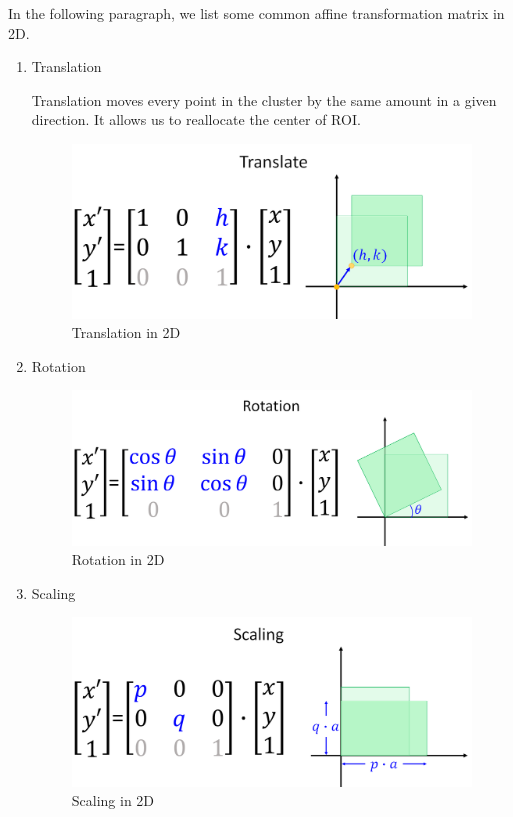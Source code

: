 In the following paragraph, we list some common affine transformation matrix in 2D.
\begin{enumerate}
    \item Translation 
            
            Translation moves every point in the cluster by the same amount in a given direction.
            It allows us to reallocate the center of ROI.

\begin{figure}[H]
\centering
\includegraphics[width=\textwidth]{Translation}
\caption{Translation in 2D}\label{fig:Translation}
\end{figure}


    \item Rotation 

\begin{figure}[H]
\centering
\includegraphics[]{Rotation}
\caption{Rotation in 2D}\label{fig:Rotation}
\end{figure}

    \item Scaling 

\begin{figure}[H]
\centering
\includegraphics[width=\textwidth]{Scaling}
\caption{Scaling in 2D}\label{fig:Scaling}
\end{figure}


\end{enumerate}
